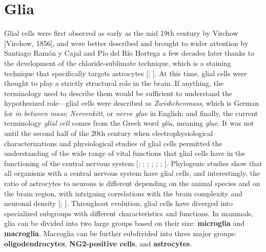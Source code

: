 \section{Glia}
\label{chap1:sec2:glia}
Glial cells were first observed as early as the mid 19th century by Virchow [Virchow, 1856], and were better described and brought to wider attention by Santiago Ram{\'o}n y Cajal and P{\'i}o del R{\'i}o Hortega a few decades later thanks to the development of the chloride-sublimate technique, which is a staining technique that specifically targets astrocytes [\cite{cajal1895}; \cite{delriohortega1921}].
At this time, glial cells were thought to play a strictly structural role in the brain.
If anything, the terminology used to describe them would be sufficient to understand the hypothesized role—glial cells were described as \textit{Zwishchenmass}, which is German for \textit{in between mass}; \textit{Nervenkitt}, or \textit{nerve glue} in English; and finally, the current terminology \textit{glial cell} comes from the Greek word \textit{gl\'ia}, meaning \textit{glue}.
It was not until the second half of the 20th century when electrophysiological characterizations and physiological studies of glial cells permitted the understanding of the wide range of vital functions that glial cells have in the functioning of the central nervous system [\cite{morrison1981growth}; \cite{bowman1984}; \cite{kettenmann1984}; \cite{kettenmann1984aspartate}; \cite{cornell-bell1990}; \cite{araque1998}; \cite{bezzi1998prostaglandins}]. 
Phylogenic studies show that all organisms with a central nervous system have glial cells, and interestingly, the ratio of astrocytes to neurons is different depending on the animal species and on the brain region, with intriguing correlations with the brain complexity and neuronal density [\cite{herculano2011scaling}; \cite{herculano2014}].   
Throughout evolution, glial cells have diverged into specialized subgroups with different characteristics and functions. 
In mammals, glia can be divided into two large groups based on their size: \textbf{microglia} and \textbf{macroglia}.
Macroglia can be further subdivided into three major groups: \textbf{oligodendrocytes}, \textbf{NG2-positive cells}, and \textbf{astrocytes}. 

